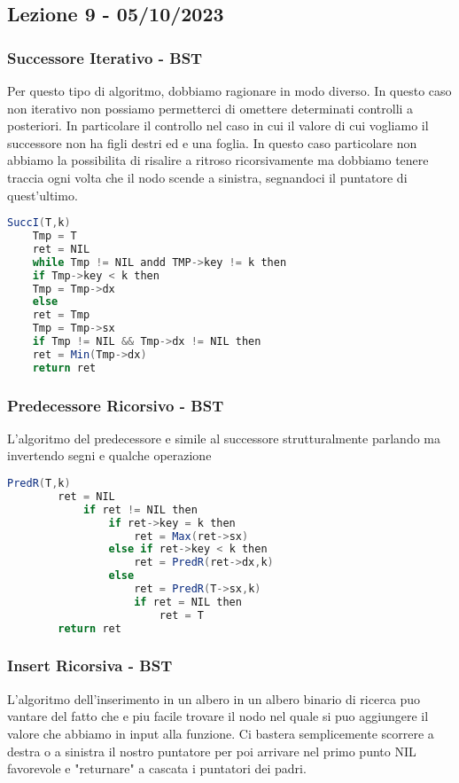 \subsection{Lezione 9 - 05/10/2023}

\subsubsection{Successore Iterativo - BST}

Per questo tipo di algoritmo, dobbiamo ragionare in modo diverso. In questo caso non iterativo non possiamo permetterci di omettere determinati controlli a posteriori. In particolare il controllo nel caso in cui il valore di cui vogliamo il successore non ha figli destri ed e una foglia. In questo caso particolare non abbiamo la possibilita di risalire a ritroso ricorsivamente ma dobbiamo tenere traccia ogni volta che il nodo scende a sinistra, segnandoci il puntatore di quest'ultimo.

\begin{lstlisting}[language=Java]
	SuccI(T,k)
	Tmp = T
	ret = NIL
	while Tmp != NIL andd TMP->key != k then
	if Tmp->key < k then
	Tmp = Tmp->dx
	else 
	ret = Tmp
	Tmp = Tmp->sx
	if Tmp != NIL && Tmp->dx != NIL then
	ret = Min(Tmp->dx)
	return ret
\end{lstlisting}


\subsubsection{Predecessore Ricorsivo - BST}
L'algoritmo del predecessore e simile al successore strutturalmente parlando ma invertendo segni e qualche operazione

\begin{lstlisting}[language=Java]
	PredR(T,k)
		ret = NIL
			if ret != NIL then
				if ret->key = k then
					ret = Max(ret->sx)
				else if ret->key < k then
					ret = PredR(ret->dx,k)
				else 
					ret = PredR(T->sx,k)
					if ret = NIL then
						ret = T
		return ret
\end{lstlisting}

\subsubsection{Insert Ricorsiva - BST}

L'algoritmo dell'inserimento in un albero in un albero binario di ricerca puo vantare del fatto che e piu facile trovare il nodo nel quale si puo aggiungere il valore che abbiamo in input alla funzione. Ci bastera semplicemente scorrere a destra o a sinistra il nostro puntatore per poi arrivare nel primo punto NIL favorevole e "returnare" a cascata i puntatori dei padri.

